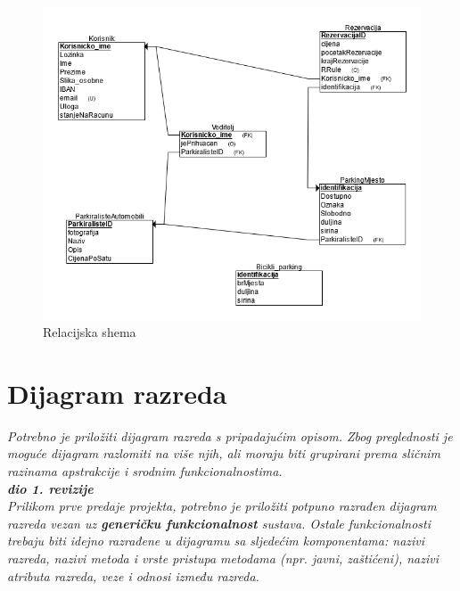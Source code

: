 				\begin{figure}[H]
					\includegraphics[scale=0.7]{slike/rlc.PNG} %
					\caption{Relacijska shema}
					\label{fig:relshema} %
				\end{figure}
				
				
				
				
				
			
			
			
			
			
			\eject
			
			
		\section{Dijagram razreda}
		
			\textit{Potrebno je priložiti dijagram razreda s pripadajućim opisom. Zbog preglednosti je moguće dijagram razlomiti na više njih, ali moraju biti grupirani prema sličnim razinama apstrakcije i srodnim funkcionalnostima.}\\
			
			\textbf{\textit{dio 1. revizije}}\\
			
			\textit{Prilikom prve predaje projekta, potrebno je priložiti potpuno razrađen dijagram razreda vezan uz \textbf{generičku funkcionalnost} sustava. Ostale funkcionalnosti trebaju biti idejno razrađene u dijagramu sa sljedećim komponentama: nazivi razreda, nazivi metoda i vrste pristupa metodama (npr. javni, zaštićeni), nazivi atributa razreda, veze i odnosi između razreda.}\\
			
